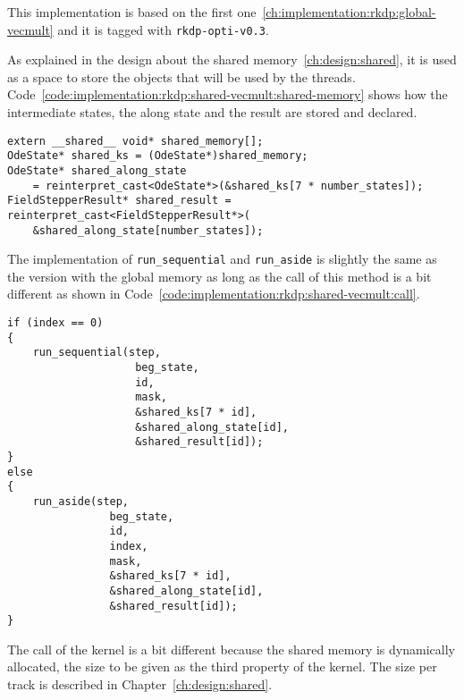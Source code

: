 This implementation is based on the first one~\ref{ch:implementation:rkdp:global-vecmult}
and it is tagged with \texttt{rkdp-opti-v0.3}.

As explained in the design about the shared memory~\ref{ch:design:shared},
it is used as a space to store the objects that will be used by the threads.
Code~\ref{code:implementation:rkdp:shared-vecmult:shared-memory} shows how the
intermediate states, the along state and the result are stored and declared.

\begin{code}
    \label{code:implementation:rkdp:shared-vecmult:shared-memory}
    \begin{verbatim}
extern __shared__ void* shared_memory[];
OdeState* shared_ks = (OdeState*)shared_memory;
OdeState* shared_along_state
    = reinterpret_cast<OdeState*>(&shared_ks[7 * number_states]);
FieldStepperResult* shared_result = reinterpret_cast<FieldStepperResult*>(
    &shared_along_state[number_states]);
    \end{verbatim}
\end{code}

The implementation of \texttt{run\_sequential} and \texttt{run\_aside} is
slightly the same as the version with the global memory as long as the call of
this method is a bit different as shown in
Code~\ref{code:implementation:rkdp:shared-vecmult:call}.

\begin{code}
    \label{code:implementation:rkdp:shared-vecmult:call}
    \begin{verbatim}
if (index == 0)
{
    run_sequential(step,
                    beg_state,
                    id,
                    mask,
                    &shared_ks[7 * id],
                    &shared_along_state[id],
                    &shared_result[id]);
}
else
{
    run_aside(step,
                beg_state,
                id,
                index,
                mask,
                &shared_ks[7 * id],
                &shared_along_state[id],
                &shared_result[id]);
}
    \end{verbatim}
\end{code}

The call of the kernel is a bit different because the shared memory is
dynamically allocated, the size to be given as the third property of the
kernel.
The size per track is described in Chapter~\ref{ch:design:shared}.

